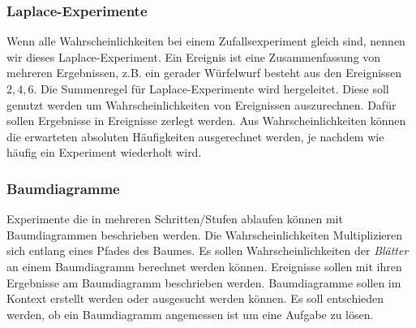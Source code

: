 \documentclass{article}
\begin{document}
\subsubsection*{Laplace-Experimente}
Wenn alle Wahrscheinlichkeiten bei einem Zufallsexperiment gleich sind, nennen wir dieses Laplace-Experiment.
Ein Ereignis ist eine Zusammenfassung von mehreren Ergebnissen, z.B. ein gerader Würfelwurf besteht aus den Ereignissen $2,4,6$. Die Summenregel für Laplace-Experimente wird hergeleitet.
Diese soll genutzt werden um Wahrscheinlichkeiten von Ereignissen auszurechnen.
Dafür sollen Ergebnisse in Ereignisse zerlegt werden.
Aus Wahrscheinlichkeiten können die erwarteten absoluten Häufigkeiten ausgerechnet werden, je nachdem wie häufig ein Experiment wiederholt wird.
\subsubsection*{Baumdiagramme}
Experimente die in mehreren Schritten/Stufen ablaufen können mit Baumdiagrammen beschrieben werden.
Die Wahrscheinlichkeiten Multiplizieren sich entlang eines Pfades des Baumes.
Es sollen Wahrscheinlichkeiten der \textit{Blätter} an einem Baumdiagramm berechnet werden können. Ereignisse sollen mit ihren Ergebnisse am Baumdiagramm beschrieben werden.
Baumdiagramme sollen im Kontext erstellt werden oder ausgesucht werden können.
Es soll entschieden werden, ob ein Baumdiagramm angemessen ist um eine Aufgabe zu lösen.
\end{document}
